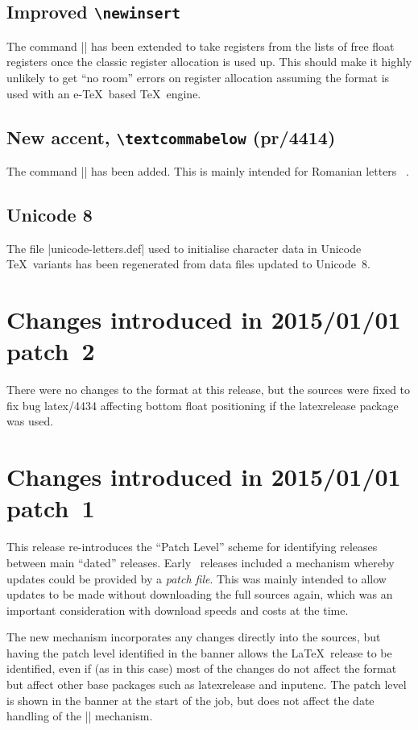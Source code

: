 \documentclass{ltxguide}
\newcommand\Lpack[1]{\mbox{\textsf{#1}}}
\begin{document}
\subsection{Improved \texttt{\textbackslash newinsert}}
The command |\newinsert| has been extended to take registers from the lists of free float
registers once the classic register allocation is used up. This should make it highly unlikely
to get ``no room'' errors on register allocation assuming the format is used with
an e-\TeX\ based \TeX\ engine.

\subsection{New accent, \texttt{\textbackslash textcommabelow} (pr/4414)}
The command |\textcommabelow| has been added. This is mainly intended for Romanian letters
\,\,\,.

\subsection{Unicode 8}
The file |unicode-letters.def| used to initialise character data in
Unicode \TeX\ variants has been regenerated from data files updated
to Unicode~8.

\section{Changes  introduced in 2015/01/01 patch~2}
There were no changes to the format at this release, but the sources were fixed to fix bug latex/4434
affecting bottom float positioning if the \Lpack{latexrelease} package was used.

\section{Changes  introduced in 2015/01/01 patch~1}
This release re-introduces the ``Patch Level'' scheme for identifying
releases between main ``dated'' releases. Early \LaTeXe\ releases
included a mechanism whereby updates could be provided by a 
\emph{patch
  file}. This was mainly intended to allow updates to be made without
downloading the full sources again, which was an important
consideration with download speeds and costs at the time.

The new mechanism incorporates any changes directly into the sources,
but having the patch level identified in the banner allows the
\LaTeX\ release to be identified, even if (as in this case) most of the
changes do not affect the format but affect other base packages such
as \Lpack{latexrelease} and \Lpack{inputenc}. The patch level is shown
in the banner at the start of the job, but does not affect the date
handling of the |\IncludeInRelease| mechanism.
\end{document}
